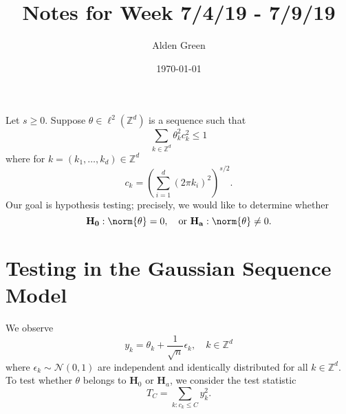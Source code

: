 \documentclass{article}
\newcommand{\1}{\mathbb{I}}
\theoremstyle{alden}
\theoremstyle{aldenthm}
\theoremstyle{definition}
\theoremstyle{remark}
\begin{document}
\title{Notes for Week 7/4/19 - 7/9/19}
\author{Alden Green}
\date{\today}
\maketitle

Let $s \geq 0$. Suppose $\theta \in \ell^2(\mathbb{Z}^d)$ is a sequence such that
\begin{equation*}
\sum_{k \in \mathbb{Z}^d} \theta_k^2 c_k^2 \leq 1
\end{equation*}
where for $k = (k_1, \ldots, k_d) \in \mathbb{Z}^d$
\begin{equation*}
c_k = \left(\sum_{i = 1}^{d} (2\pi k_i)^2\right)^{s/2}.
\end{equation*}
Our goal is hypothesis testing; precisely, we would like to determine whether
\begin{equation*}
\mathbf{H_0}: \norm{\theta} = 0, \quad \textrm{or}~ \mathbf{H_a}: \norm{\theta} \neq 0.
\end{equation*}

\section{Testing in the Gaussian Sequence Model}

We observe
\begin{equation*}
y_k = \theta_k + \frac{1}{\sqrt{n}}\epsilon_k, \quad k \in \mathbb{Z}^d
\end{equation*}
where $\epsilon_k \sim \mathcal{N}(0,1)$ are independent and identically distributed for all $k \in \mathbb{Z}^d$. To test whether $\theta$ belongs to $\mathbf{H}_0$ or $\mathbf{H}_a$, we consider the test statistic
\begin{equation*}
T_C = \sum_{k: c_k \leq C} y_k^2.
\end{equation*}
\end{document}
